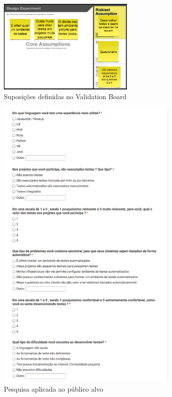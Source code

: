 \begin{figure}
  \centering
  \includegraphics[width=0.6\textwidth]{imagens/assumptions.png}
  \caption{Suposições definidas no Validation Board}
  \label{fig:LABEL_FIG_3}
\end{figure}

\begin{figure}
  \centering
  \includegraphics[width=0.8\textwidth]{imagens/survey.png}
  \caption{Pesquisa aplicada ao público alvo}
  \label{fig:LABEL_FIG_4}
\end{figure}

